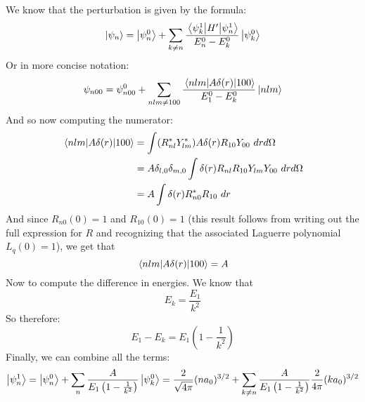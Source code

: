 \documentclass[10pt]{article}
\begin{document}
\begin{enumerate}[label=(\alph*)]
        \begin{solution}
            We know that the perturbation is given by the formula: 
            \[ \ket{\psi_n} = \ket{\psi_n^0} + \sum_{k \neq n}\frac{\mel{\psi_k^1}{H'}{\psi_n^1}}{E_n^0 - E_k^0} \ket{\psi_{k}^0}\]
            Or in more concise notation: 
            \[ \psi_{n00} = \psi_{n00}^0 + \sum_{nlm \neq 100} \frac{\mel{nlm}{A\delta(r)}{100}}{E_1^0 - E_k^0} \ket{nlm}\]
            And so now computing the numerator: 
            \begin{align*}
                \mel{nlm}{A\delta(r)}{100} &= \int (R_{nl}^* Y_{lm}^*)A\delta(r) R_{10} Y_{00} \ dr d\Omega\\
                &= A \delta_{l, 0} \delta_{m, 0} \int \delta(r) R_{nl}R_{10} Y_{lm} Y_{00} \ dr d\Omega\\
                &= A \int  \delta(r) R_{n0}^* R_{10} \ dr
            \end{align*}
            And since $R_{n0}(0) = 1$ and $R_{10}(0) = 1$ (this result follows from writing out the full expression for $R$ and recognizing that the associated Laguerre polynomial $L_q(0) = 1$), we get that 
            \[ \mel{nlm}{A\delta(r)}{100} = A\]
            Now to compute the difference in energies. We know that 
            \[ E_k = \frac{E_1}{k^2}\]
            So therefore: 
            \[ E_1 - E_k = E_1 \left( 1 - \frac{1}{k^2}\right)\]
            Finally, we can combine all the terms: 
            \[ \ket{\psi_n^1} = \ket{\psi_n^0} + \sum_{n} \frac{A}{E_1\left(1 - \frac{1}{k^2}\right)}\ket{\psi_{k}^0} = \frac{2}{\sqrt{4\pi}} (na_0)^{3/2} + \sum_{k \neq n} \frac{A}{E_1\left( 1 - \frac{1}{k^2}\right)} \frac{2}{4\pi}(ka_0)^{3/2}\]
        \end{solution}
    \end{enumerate}
\end{document}
